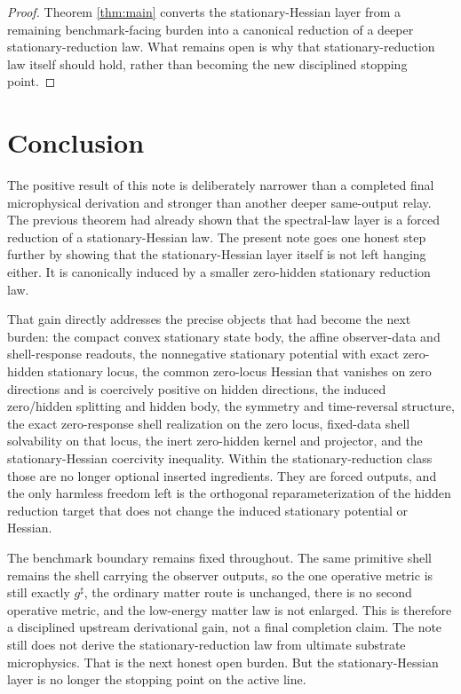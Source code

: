 \documentclass[11pt]{article}
\newcommand{\CompletedMetric}{g^{\sharp}}
\begin{document}
\begin{proof}
Theorem \ref{thm:main} converts the stationary-Hessian layer from a remaining benchmark-facing burden into a canonical reduction of a deeper stationary-reduction law. What remains open is why that stationary-reduction law itself should hold, rather than becoming the new disciplined stopping point.
\end{proof}

\section{Conclusion}

The positive result of this note is deliberately narrower than a completed final microphysical derivation and stronger than another deeper same-output relay. The previous theorem had already shown that the spectral-law layer is a forced reduction of a stationary-Hessian law. The present note goes one honest step further by showing that the stationary-Hessian layer itself is not left hanging either. It is canonically induced by a smaller zero-hidden stationary reduction law.

That gain directly addresses the precise objects that had become the next burden: the compact convex stationary state body, the affine observer-data and shell-response readouts, the nonnegative stationary potential with exact zero-hidden stationary locus, the common zero-locus Hessian that vanishes on zero directions and is coercively positive on hidden directions, the induced zero/hidden splitting and hidden body, the symmetry and time-reversal structure, the exact zero-response shell realization on the zero locus, fixed-data shell solvability on that locus, the inert zero-hidden kernel and projector, and the stationary-Hessian coercivity inequality. Within the stationary-reduction class those are no longer optional inserted ingredients. They are forced outputs, and the only harmless freedom left is the orthogonal reparameterization of the hidden reduction target that does not change the induced stationary potential or Hessian.

The benchmark boundary remains fixed throughout. The same primitive shell remains the shell carrying the observer outputs, so the one operative metric is still exactly \(\CompletedMetric\), the ordinary matter route is unchanged, there is no second operative metric, and the low-energy matter law is not enlarged. This is therefore a disciplined upstream derivational gain, not a final completion claim. The note still does not derive the stationary-reduction law from ultimate substrate microphysics. That is the next honest open burden. But the stationary-Hessian layer is no longer the stopping point on the active line.
\end{document}
